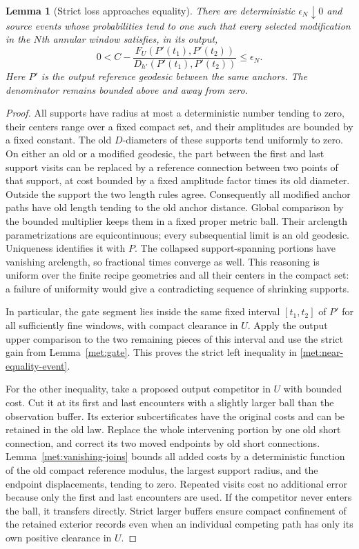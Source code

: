 \documentclass[11pt]{article}
\numberwithin{equation}{section}
\newtheorem{lemma}[theorem]{Lemma}
\theoremstyle{definition}
\theoremstyle{remark}
\newcommand{\1}{\mathbf 1}
\begin{document}
\begin{lemma}[Strict loss approaches equality]
\label{met:near-equality}
There are deterministic $\epsilon_N\downarrow0$ and source events
whose probabilities tend to one such that every selected
modification in the $N$th annular window satisfies, in its output,
\begin{equation}
 0<C-
 \frac{F_U(P'(t_1),P'(t_2))}
      {D_{h'}(P'(t_1),P'(t_2))}
 \leq\epsilon_N.
 \label{met:near-equality-event}
\end{equation}
Here $P'$ is the output reference geodesic between the same anchors.
The denominator remains bounded above and away from zero.
\end{lemma}

\begin{proof}
All supports have radius at most a deterministic number tending to
zero, their centers range over a fixed compact set, and their
amplitudes are bounded by a fixed constant.  The old $D$-diameters of
these supports tend uniformly to zero.  On either an old or a
modified geodesic, the part between the first and last support visits
can be replaced by a reference connection between two points of that
support, at cost bounded by a fixed amplitude factor times its old
diameter.  Outside the support the two length rules agree.
Consequently all modified anchor paths have old length tending to the
old anchor distance.  Global comparison by the bounded multiplier
keeps them in a fixed proper metric ball.  Their arclength
parametrizations are equicontinuous; every subsequential limit is an
old geodesic.  Uniqueness identifies it with $P$.  The collapsed
support-spanning portions have vanishing arclength, so fractional
times converge as well.  This reasoning is uniform over the finite
recipe geometries and all their centers in the compact set: a
failure of uniformity would give a contradicting sequence of
shrinking supports.

In particular, the gate segment lies inside the same fixed interval
$[t_1,t_2]$ of $P'$ for all sufficiently fine windows, with compact
clearance in $U$.  Apply the output upper comparison to the two
remaining pieces of this interval and use the strict gain from
Lemma~\ref{met:gate}.  This proves the strict left inequality in
\eqref{met:near-equality-event}.

For the other inequality, take a proposed output competitor in $U$
with bounded cost.  Cut it at its first and last encounters with a
slightly larger ball than the observation buffer.  Its exterior
subcertificates have the original costs and can be retained in the
old law.  Replace the whole intervening portion by one old short
connection, and correct its two moved endpoints by old short
connections.  Lemma~\ref{met:vanishing-joins} bounds all added costs
by a deterministic function of the old compact reference modulus,
the largest support radius, and the endpoint displacements, tending
to zero.  Repeated visits cost no additional error because only the
first and last encounters are used.  If the competitor never enters
the ball, it transfers directly.  Strict larger buffers ensure
compact confinement of the retained exterior records even when an
individual competing path has only its own positive clearance in
$U$.


\end{proof}
\end{document}
